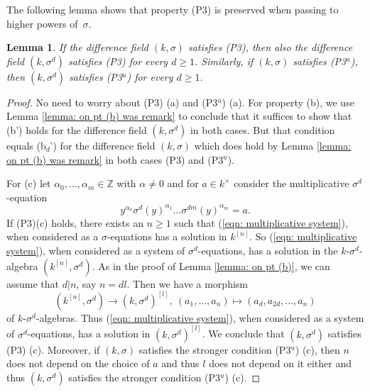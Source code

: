 \documentclass[oneside,reqno]{amsart}
\newtheorem{lemma}[theo]{Lemma}
\theoremstyle{definition}
\newcommand{\s}{\sigma}
\newcommand{\ks}{$k$\=/$\s$}
\newcommand{\kn}{k^{[n]}}
\newcommand{\pt}{{\rm{(P3$^u$)}}}
\newcommand{\ptweak}{{\rm{(P3)}}}
\begin{document}
The following lemma shows that property \ptweak{} is preserved when passing to higher powers of~$\s$.

\begin{lemma} \label{lem: pt for powers of s}
	If the difference field $(k,\s)$ satisfies \ptweak{}, then also the difference field $(k,\s^d)$ satisfies \ptweak{} for every $d\geq 1$. Similarly, if  $(k,\s)$ satisfies \pt{}, then $(k,\s^d)$ satisfies \pt{} for every $d\geq 1$. 
\end{lemma}
\begin{proof}
	No need to worry about \ptweak{} (a) and \pt{} (a). 	
	For property (b), we use Lemma \ref{lemma: on pt (b) was remark} to conclude that it suffices to show that (b') holds for the difference field $(k,\s^d)$ in both cases. But that condition equals  (b$_d$') for the difference field $(k,\s)$ which does hold by Lemma \ref{lemma: on pt (b) was remark} in both cases \ptweak{} and \pt{}. 
	
	For (c) let $\alpha_0,\ldots,\alpha_m\in\mathbb{Z}$ with $\alpha\neq 0$ and for $a\in k^\times$ consider the multiplicative $\s^d$-equation
	\begin{equation} \label{eqn: multiplicative system}
	y^{\alpha_0}\s^d(y)^{\alpha_1}\ldots\s^{dm}(y)^{\alpha_m}=a.
	\end{equation}
%	
 If \ptweak{}(c) holds, there exists an $n\geq 1$ such that (\ref{eqn: multiplicative system}), when considered as a $\s$-equations has a solution in $\kn$.
	So (\ref{eqn: multiplicative system}), when considered as a system of $\s^d$-equations, has a solution in the $k$-$\s^d$-algebra $(\kn,\s^d)$.
	As in the proof of Lemma \ref{lemma: on pt (b)}, we can assume that $d|n$, say $n=dl$. Then we have a morphism
	$$(\kn,\s^d)\to (k,\s^d)^{[l]},\ (a_1,\ldots,a_n)\mapsto(a_d,a_{2d},\ldots,a_n)$$
	of $k$-$\s^d$-algebras. Thus (\ref{eqn: multiplicative system}), when considered as a system of $\s^d$-equations, has a solution in $(k,\s^d)^{[l]}$. We conclude that $(k,\s^d)$ satisfies \ptweak{} (c). Moreover, if $(k,\s)$ satisfies the stronger condition \pt{} (c), then $n$ does not depend on the choice of $a$ and thus $l$ does not depend on it either and thus $(k,\s^d)$ satisfies the stronger condition \pt{} (c).	
\end{proof}
\end{document}
